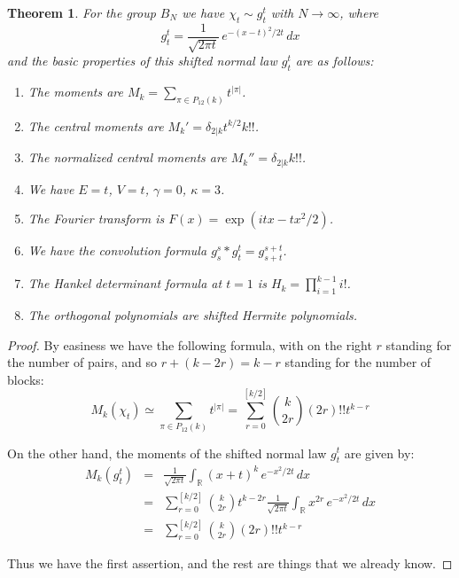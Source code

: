 \documentclass[12pt]{amsbook}
\newtheorem{theorem}{Theorem}[chapter]
\begin{document}
\begin{theorem}
For the group $B_N$ we have $\chi_t\sim g_t^t$ with $N\to\infty$, where
$$g_t^t=\frac{1}{\sqrt{2\pi t}}\,e^{-(x-t)^2/2t}\,dx$$
and the basic properties of this shifted normal law $g_t^t$ are as follows:
\begin{enumerate}
\item The moments are $M_k=\sum_{\pi\in P_{12}(k)}t^{|\pi|}$.

\item The central moments are $M_k'=\delta_{2|k}t^{k/2}k!!$.

\item The normalized central moments are $M_k''=\delta_{2|k}k!!$.

\item We have $E=t$, $V=t$, $\gamma=0$, $\kappa=3$.

\item The Fourier transform is $F(x)=\exp(itx-tx^2/2)$.

\item We have the convolution formula $g_s^s*g_t^t=g_{s+t}^{s+t}$.

\item The Hankel determinant formula at $t=1$ is $H_k=\prod_{i=1}^{k-1}i!$.

\item The orthogonal polynomials are shifted Hermite polynomials.
\end{enumerate}
\end{theorem}

\begin{proof}
By easiness we have the following formula, with on the right $r$ standing for the number of pairs, and so $r+(k-2r)=k-r$ standing for the number of blocks:
$$M_k(\chi_t)\simeq\sum_{\pi\in P_{12}(k)}t^{|\pi|}=\sum_{r=0}^{[k/2]}\binom{k}{2r}(2r)!!t^{k-r}$$

On the other hand, the moments of the shifted normal law $g_t^t$ are given by:
\begin{eqnarray*}
M_k(g_t^t)
&=&\frac{1}{\sqrt{2\pi t}}\int_\mathbb R(x+t)^k\,e^{-x^2/2t}\,dx\\
&=&\sum_{r=0}^{[k/2]}\binom{k}{2r}t^{k-2r}\frac{1}{\sqrt{2\pi t}}\int_\mathbb Rx^{2r}\,e^{-x^2/2t}\,dx\\
&=&\sum_{r=0}^{[k/2]}\binom{k}{2r}(2r)!!t^{k-r}
\end{eqnarray*}

Thus we have the first assertion, and the rest are things that we already know.
\end{proof}
\end{document}

